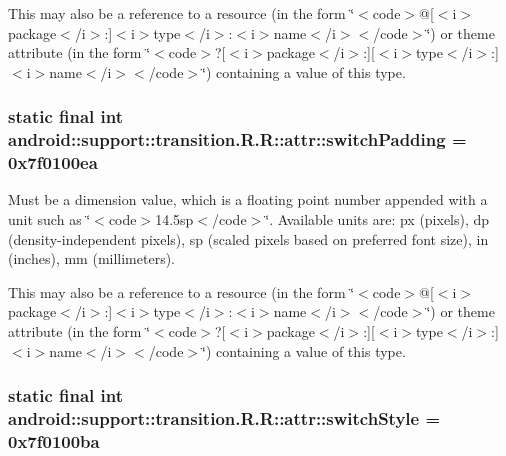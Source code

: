 This may also be a reference to a resource (in the form \char`\"{}$<$code$>$@\mbox{[}$<$i$>$package$<$/i$>$:\mbox{]}$<$i$>$type$<$/i$>$:$<$i$>$name$<$/i$>$$<$/code$>$\char`\"{}) or theme attribute (in the form \char`\"{}$<$code$>$?\mbox{[}$<$i$>$package$<$/i$>$:\mbox{]}\mbox{[}$<$i$>$type$<$/i$>$:\mbox{]}$<$i$>$name$<$/i$>$$<$/code$>$\char`\"{}) containing a value of this type. \hypertarget{classandroid_1_1support_1_1transition_1_1_r_1_1attr_bc17670e148b87695c3367124b9ccac9}{
\subsubsection[{switchPadding}]{\setlength{\rightskip}{0pt plus 5cm}static final int android::support::transition.R.R::attr::switchPadding = 0x7f0100ea}}
\label{classandroid_1_1support_1_1transition_1_1_r_1_1attr_bc17670e148b87695c3367124b9ccac9}


Must be a dimension value, which is a floating point number appended with a unit such as \char`\"{}$<$code$>$14.5sp$<$/code$>$\char`\"{}. Available units are: px (pixels), dp (density-independent pixels), sp (scaled pixels based on preferred font size), in (inches), mm (millimeters). 

This may also be a reference to a resource (in the form \char`\"{}$<$code$>$@\mbox{[}$<$i$>$package$<$/i$>$:\mbox{]}$<$i$>$type$<$/i$>$:$<$i$>$name$<$/i$>$$<$/code$>$\char`\"{}) or theme attribute (in the form \char`\"{}$<$code$>$?\mbox{[}$<$i$>$package$<$/i$>$:\mbox{]}\mbox{[}$<$i$>$type$<$/i$>$:\mbox{]}$<$i$>$name$<$/i$>$$<$/code$>$\char`\"{}) containing a value of this type. \hypertarget{classandroid_1_1support_1_1transition_1_1_r_1_1attr_a1411a32a6dc2009c760dea4a5ff16e2}{
\subsubsection[{switchStyle}]{\setlength{\rightskip}{0pt plus 5cm}static final int android::support::transition.R.R::attr::switchStyle = 0x7f0100ba}}
\label{classandroid_1_1support_1_1transition_1_1_r_1_1attr_a1411a32a6dc2009c760dea4a5ff16e2}


